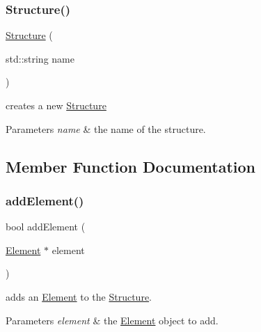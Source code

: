 \subsubsection{\texorpdfstring{Structure()}{Structure()}}
{\footnotesize\ttfamily \hyperlink{class_a_g_d_s_1_1_structure}{Structure} (\begin{DoxyParamCaption}\item[{std\+::string}]{name }\end{DoxyParamCaption})}



creates a new \hyperlink{class_a_g_d_s_1_1_structure}{Structure} 


\begin{DoxyParams}{Parameters}
{\em name} & the name of the structure. \\
\hline
\end{DoxyParams}


\subsection{Member Function Documentation}
\mbox{\label{class_a_g_d_s_1_1_structure_a2dd203e6770f7d15d6f706867c919a60}} 
\subsubsection{\texorpdfstring{add\+Element()}{addElement()}}
{\footnotesize\ttfamily bool add\+Element (\begin{DoxyParamCaption}\item[{\hyperlink{class_a_g_d_s_1_1_element}{Element} $\ast$}]{element }\end{DoxyParamCaption})}



adds an \hyperlink{class_a_g_d_s_1_1_element}{Element} to the \hyperlink{class_a_g_d_s_1_1_structure}{Structure}. 


\begin{DoxyParams}{Parameters}
{\em element} & the \hyperlink{class_a_g_d_s_1_1_element}{Element} object to add. \\
\hline
\end{DoxyParams}
